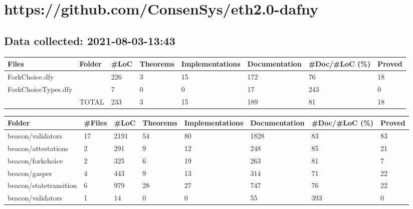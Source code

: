 \documentclass[a4paper, 12pt]{article}
\begin{document}
\section*{https://github.com/ConsenSys/eth2.0-dafny}
\subsection*{Data collected: 2021-08-03-13:43}
\scriptsize
\begin{tabular}{llllllll}
\toprule
               Files & Folder & \#LoC & Theorems & Implementations & Documentation & \#Doc/\#LoC (\%) & Proved \\
\midrule
      ForkChoice.dfy &        &  226 &        3 &              15 &           172 &            76 &     18 \\
 ForkChoiceTypes.dfy &        &    7 &        0 &               0 &            17 &           243 &      0 \\
                     &  TOTAL &  233 &        3 &              15 &           189 &            81 &     18 \\
\bottomrule
\end{tabular}

\vspace{2em}
\begin{tabular}{llllllll}
\toprule
                 Folder & \#Files &  \#LoC & Theorems & Implementations & Documentation & \#Doc/\#LoC (\%) & Proved \\
\midrule
      beacon/validators &     17 &  2191 &       54 &              80 &          1828 &            83 &     83 \\
    beacon/attestations &      2 &   291 &        9 &              12 &           248 &            85 &     21 \\
      beacon/forkchoice &      2 &   325 &        6 &              19 &           263 &            81 &      7 \\
          beacon/gasper &      4 &   443 &        9 &              13 &           314 &            71 &     22 \\
 beacon/statetransition &      6 &   979 &       28 &              27 &           747 &            76 &     22 \\
      beacon/validators &      1 &    14 &        0 &               0 &            55 &           393 &      0 \\
\bottomrule
\end{tabular}
\end{document}
